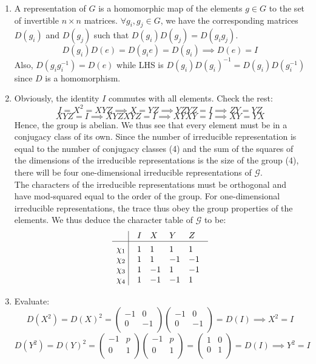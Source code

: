 \documentclass[a4paper]{article}
\begin{document}
\begin{ans}\leavevmode
\begin{enumerate}[label=(\alph*)]
\item A representation of $G$ is a homomorphic map of the elements $g\in G$ to the set of invertible $n\times n$ matrices. $\forall g_i,g_j\in G$, we have the corresponding matrices $D(g_i)$ and $D(g_j)$ such that $D(g_i)D(g_j)=D(g_ig_j)$.\\[5pt]
$$D(g_i)D(e)=D(g_ie)=D(g_i)\implies D(e)=I$$
Also, $D(g_ig_i^{-1})=D(e)$ while LHS is $D(g_i)D(g_i)^{-1}=D(g_i)D(g_i^{-1})$ since $D$ is a homomorphism.
\item Obviously, the identity $I$ commutes with all elements. Check the rest:
$$I=X^2=XYZ\implies X=YZ\implies YZYZ=I\implies ZY=YZ$$
$$XYZ=I\implies XYZXYZ=I\implies XYXY=I\implies XY=YX$$
Hence, the group is abelian. We thus see that every element must be in a conjugacy class of its own. Since the number of irreducible representation is equal to the number of conjugacy classes (4) and the sum of the squares of the dimensions of the irreducible representations is the size of the group (4), there will be four one-dimensional irreducible representations of $\mathcal{G}$.\\[5pt]
The characters of the irreducible representations must be orthogonal and have mod-squared equal to the order of the group. For one-dimensional irreducible representations, the trace thus obey the group properties of the elements. We thus deduce the character table of $\mathcal{G}$ to be:
$$\vbox{\tabskip0.5em\offinterlineskip
    \halign{\strut$#$\hfil\ \tabskip1em\vrule&&$#$\hfil\cr
    ~&I&X&Y&Z   \cr
    \noalign{\hrule}\vrule height 12pt width 0pt
     \chi_1&1&1&1&1    \cr
     \chi_2&1&1&-1&-1    \cr
     \chi_3 & 1 &-1  & 1 & -1  \cr
     \chi_4 & 1 & -1 & -1 & 1\cr
}}$$
\item Evaluate:
$$D(X^2)=D(X)^2=\begin{pmatrix}-1&0\\0&-1\\\end{pmatrix}\begin{pmatrix}-1&0\\0&-1\\\end{pmatrix}=D(I)\implies X^2=I$$
$$D(Y^2)=D(Y)^2=\begin{pmatrix}-1&p\\0&1\\\end{pmatrix}\begin{pmatrix}-1&p\\0&1\\\end{pmatrix}=\begin{pmatrix}1&0\\0&1\\\end{pmatrix}=D(I)\implies Y^2=I$$

\end{enumerate}
\end{ans}
\end{document}
